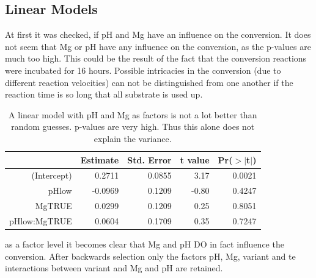 \documentclass[]{tufte-handout}
\newenvironment{Shaded}{}{}
\newcommand{\KeywordTok}[1]{\textcolor[rgb]{0.00,0.44,0.13}{\textbf{{#1}}}}
\newcommand{\DataTypeTok}[1]{\textcolor[rgb]{0.56,0.13,0.00}{{#1}}}
\newcommand{\StringTok}[1]{\textcolor[rgb]{0.25,0.44,0.63}{{#1}}}
\newcommand{\NormalTok}[1]{{#1}}
\begin{document}
\subsection{Linear Models}\label{linear-models}

At first it was checked, if pH and Mg have an influence on the
conversion. It does not seem that Mg or pH have any influence on the
conversion, as the p-values are much too high. This could be the result
of the fact that the conversion reactions were incubated for 16 hours.
Possible intricacies in the conversion (due to different reaction
velocities) can not be distinguished from one another if the reaction
time is so long that all substrate is used up.

\begin{table}[ht]
\centering
\begin{tabular}{rrrrr}
  \toprule
 & Estimate & Std. Error & t value & Pr($>$$|$t$|$) \\ 
  \midrule
(Intercept) & 0.2711 & 0.0855 & 3.17 & 0.0021 \\ 
  pHlow & -0.0969 & 0.1209 & -0.80 & 0.4247 \\ 
  MgTRUE & 0.0299 & 0.1209 & 0.25 & 0.8051 \\ 
  pHlow:MgTRUE & 0.0604 & 0.1709 & 0.35 & 0.7247 \\ 
   \bottomrule
\end{tabular}
\caption{A linear model with pH and Mg as factors is not a lot better than random guesses. p-values are very high. Thus this alone does not explain the variance.} 
\end{table}

 as a factor level
it becomes clear that Mg and pH DO in fact influence the conversion.
After backwards selection only the factors pH, Mg, variant and te
interactions between variant and Mg and pH are retained.

\begin{Shaded}
\end{Shaded}
\end{document}
